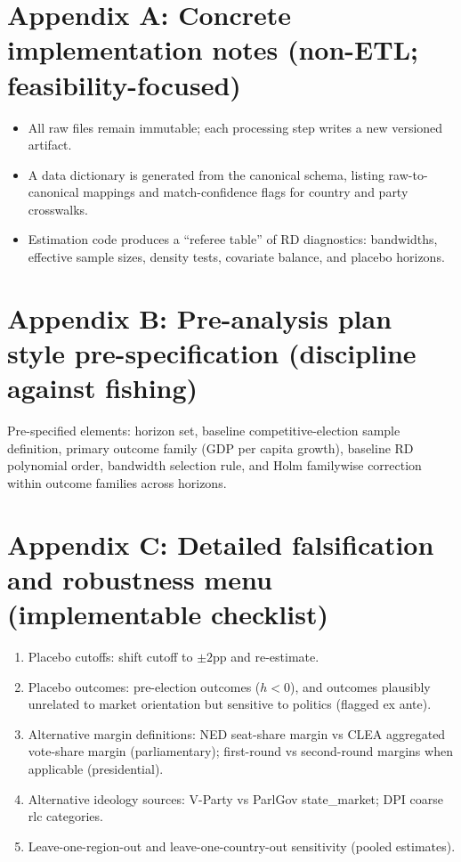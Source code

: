 \documentclass[11pt]{article}
\newcommand{\1}{\mathbf{1}}
\begin{document}
\section*{Appendix A: Concrete implementation notes (non-ETL; feasibility-focused)}
\begin{itemize}[leftmargin=1.2em]
\item All raw files remain immutable; each processing step writes a new versioned artifact.
\item A data dictionary is generated from the canonical schema, listing raw-to-canonical mappings and match-confidence flags for country and party crosswalks.
\item Estimation code produces a ``referee table'' of RD diagnostics: bandwidths, effective sample sizes, density tests, covariate balance, and placebo horizons.
\end{itemize}

\section*{Appendix B: Pre-analysis plan style pre-specification (discipline against fishing)}
Pre-specified elements: horizon set, baseline competitive-election sample definition, primary outcome family (GDP per capita growth), baseline RD polynomial order, bandwidth selection rule, and Holm familywise correction within outcome families across horizons.

\section*{Appendix C: Detailed falsification and robustness menu (implementable checklist)}
\begin{enumerate}[leftmargin=1.2em]
\item Placebo cutoffs: shift cutoff to $\pm 2$pp and re-estimate.
\item Placebo outcomes: pre-election outcomes ($h<0$), and outcomes plausibly unrelated to market orientation but sensitive to politics (flagged ex ante).
\item Alternative margin definitions: NED seat-share margin vs CLEA aggregated vote-share margin (parliamentary); first-round vs second-round margins when applicable (presidential).
\item Alternative ideology sources: V-Party vs ParlGov state\_market; DPI coarse rlc categories.
\item Leave-one-region-out and leave-one-country-out sensitivity (pooled estimates).
\end{enumerate}
\end{document}
